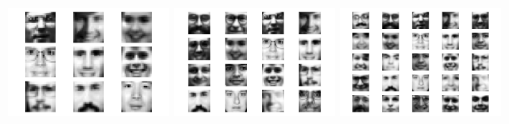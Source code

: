\begin{center}
\includegraphics[width=0.32\textwidth]{Ex_03/Figures/imgs_k9.pdf}
\hfill
\includegraphics[width=0.32\textwidth]{Ex_03/Figures/imgs_k16.pdf}
\hfill
\includegraphics[width=0.32\textwidth]{Ex_03/Figures/imgs_k25.pdf}
\end{center}



